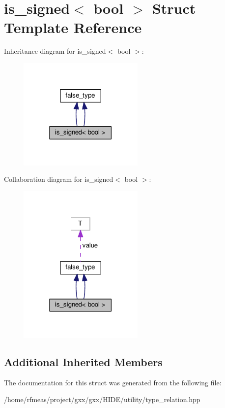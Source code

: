 \hypertarget{structis__signed_3_01bool_01_4}{}\section{is\+\_\+signed$<$ bool $>$ Struct Template Reference}
\label{structis__signed_3_01bool_01_4}


Inheritance diagram for is\+\_\+signed$<$ bool $>$\+:
\nopagebreak
\begin{figure}[H]
\begin{center}
\leavevmode
\includegraphics[width=174pt]{structis__signed_3_01bool_01_4__inherit__graph}
\end{center}
\end{figure}


Collaboration diagram for is\+\_\+signed$<$ bool $>$\+:
\nopagebreak
\begin{figure}[H]
\begin{center}
\leavevmode
\includegraphics[width=174pt]{structis__signed_3_01bool_01_4__coll__graph}
\end{center}
\end{figure}
\subsection*{Additional Inherited Members}


The documentation for this struct was generated from the following file\+:\begin{DoxyCompactItemize}
\item 
/home/rfmeas/project/gxx/gxx/\+H\+I\+D\+E/utility/type\+\_\+relation.\+hpp\end{DoxyCompactItemize}
